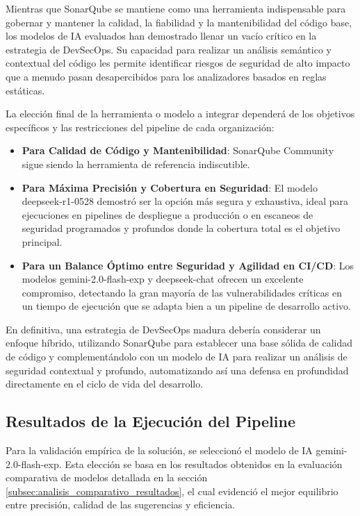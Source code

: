 Mientras que SonarQube se mantiene como una herramienta indispensable para gobernar y mantener la calidad, la fiabilidad y la mantenibilidad del código base, los modelos de IA evaluados han demostrado llenar un vacío crítico en la estrategia de DevSecOps. Su capacidad para realizar un análisis semántico y contextual del código les permite identificar riesgos de seguridad de alto impacto que a menudo pasan desapercibidos para los analizadores basados en reglas estáticas.

La elección final de la herramienta o modelo a integrar dependerá de los objetivos específicos y las restricciones del pipeline de cada organización:
\begin{itemize}
    \item \textbf{Para Calidad de Código y Mantenibilidad}: SonarQube Community sigue siendo la herramienta de referencia indiscutible.
    \item \textbf{Para Máxima Precisión y Cobertura en Seguridad}: El modelo deepseek-r1-0528 demostró ser la opción más segura y exhaustiva, ideal para ejecuciones en pipelines de despliegue a producción o en escaneos de seguridad programados y profundos donde la cobertura total es el objetivo principal.
    \item \textbf{Para un Balance Óptimo entre Seguridad y Agilidad en CI/CD}: Los modelos gemini-2.0-flash-exp y deepseek-chat ofrecen un excelente compromiso, detectando la gran mayoría de las vulnerabilidades críticas en un tiempo de ejecución que se adapta bien a un pipeline de desarrollo activo.
\end{itemize}

En definitiva, una estrategia de DevSecOps madura debería considerar un enfoque híbrido, utilizando SonarQube para establecer una base sólida de calidad de código y complementándolo con un modelo de IA para realizar un análisis de seguridad contextual y profundo, automatizando así una defensa en profundidad directamente en el ciclo de vida del desarrollo.

\subsection{Resultados de la Ejecución del Pipeline}
\label{subsec:analisis_resultados_pipeline}

Para la validación empírica de la solución, se seleccionó el modelo de IA gemini-2.0-flash-exp. Esta elección se basa en los resultados obtenidos en la evaluación comparativa de modelos detallada en la sección \ref{subsec:analisis_comparativo_resultados}, el cual evidenció el mejor equilibrio entre precisión, calidad de las sugerencias y eficiencia.

